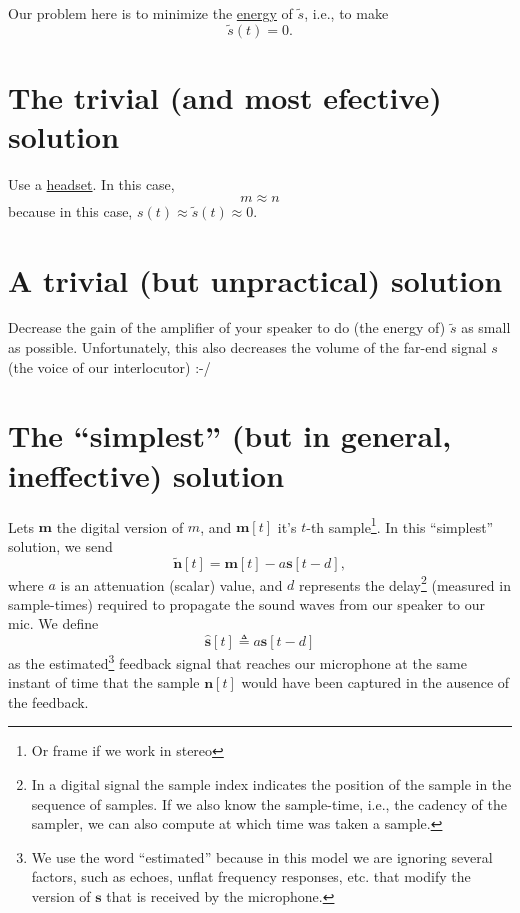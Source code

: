 Our problem here is to minimize the
\href{https://en.wikipedia.org/wiki/Energy_(signal_processing)}{energy}
of $\tilde{s}$, i.e., to make
\begin{equation}
  \tilde{s}(t) = 0.
\end{equation}

\section{The trivial (and most efective) solution}

Use a \href{https://en.wikipedia.org/wiki/Audio_headset}{headset}. In
this case,
\begin{equation}
  m \approx n
  \label{eq:headset_solution}
\end{equation}
because in this case, $s(t)\approx\tilde{s}(t)\approx 0$.

\section{A trivial (but unpractical) solution}

Decrease the gain of the amplifier of your speaker to do (the energy
of) $\tilde{s}$ as small as possible. Unfortunately, this also
decreases the volume of the far-end signal $s$ (the voice of our
interlocutor) :-/

\section{The ``simplest'' (but in general, ineffective) solution}
Lets ${\mathbf m}$ the digital version of $m$, and ${\mathbf m}[t]$
it's $t$-th sample\footnote{Or frame if we work in stereo}. In this
``simplest'' solution, we send
\begin{equation}
  \tilde{\mathbf n}[t] = {\mathbf m}[t] - a{\mathbf s}[t-d],
  \label{eq:simplest}
\end{equation}
where $a$ is an attenuation (scalar) value, and $d$ represents the
delay\footnote{In a digital signal the sample index indicates the
  position of the sample in the sequence of samples. If we also know
  the sample-time, i.e., the cadency of the sampler, we can also
  compute at which time was taken a sample.} (measured in
sample-times) required to propagate the sound waves from our speaker
to our mic. We define
\begin{equation}
  \hat{\mathbf s}[t] \triangleq a{\mathbf s}[t-d]
  \label{eq:minimal_filter}
\end{equation}
as the estimated\footnote{We use the word ``estimated'' because in
this model we are ignoring several factors, such as echoes, unflat
frequency responses, etc.  that modify the version of $\mathbf{s}$
that is received by the microphone.} feedback signal that reaches our
microphone at the same instant of time that the sample ${\mathbf
  n}[t]$ would have been captured in the ausence of the feedback.

